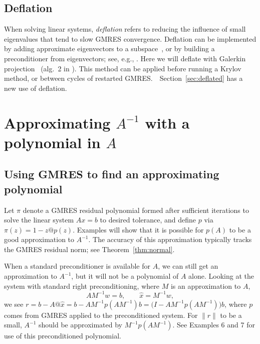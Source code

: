 \documentclass{siamart}
\begin{document}
\subsection{Deflation} \label{sec:reviewsub3}

When solving linear systems, \emph{deflation} refers to reducing the influence of small eigenvalues that tend to slow GMRES convergence. Deflation can be implemented by adding approximate eigenvectors to a subspace~\cite{GMRES-E,GMRES-DR}, or by building a preconditioner from eigenvectors; see, e.g., \cite{KhYe,PadeStMaJoMa,SiEmMo}.  Here we will deflate with Galerkin projection~\cite{MultPolyMonteCarlo,GMRES-DR,gproj,SiGa,StOr} (alg.~2 in \cite{MGLE}).  This method can be applied before running a Krylov method, or between cycles of restarted GMRES.\ \ Section~\ref{sec:deflated} has a new use of deflation.

\section{Approximating \boldmath $A^{-1}$ with a polynomial in $A$} \label{sec:poly}

\subsection{Using GMRES to find an approximating polynomial}

Let $\pi$ denote a GMRES residual polynomial
formed after sufficient iterations 
to solve the linear system $Ax=b$ to desired tolerance, and define $p$ via $\pi(z) = 1- z@p(z)$.  
Examples will show that it is possible for $p(A)$ to be a good approximation to $A^{-1}$.  The accuracy of this approximation typically tracks the GMRES residual norm; see Theorem~\ref{thm:normal}.

When a standard preconditioner is available for $A$, we can still get an approximation to $A^{-1}$, but it will not be a polynomial of  $A$ alone.
Looking at the system with standard right preconditioning, where $M$ is an approximation to $A$,
\[ A M^{-1} w = b,  \qquad
\widehat{x} = M^{-1}w, 
\]
we see $r = b-A@\widehat{x} = b - A M^{-1} p(A M^{-1})b = \big(I-A M^{-1} p(A M^{-1})\big)b$, where $p$ comes from GMRES applied to the preconditioned system.  For $\|r\|$ to be a small, $A^{-1}$ should be approximated by $M^{-1}p(A M^{-1})$.  See Examples 6 and 7 for use of this preconditioned polynomial.  
\end{document}
